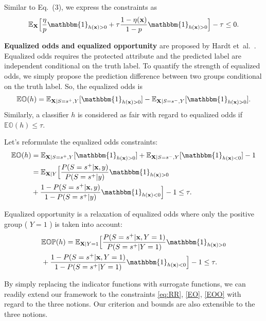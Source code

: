 \documentclass[letterpaper]{article} %
\def\etal{et~al.~}			  %
\newcommand{\X}{\mathbf{X}}
\newcommand{\x}{\mathbf{x}}
\newcommand{\Y}{Y}
\newcommand{\y}{y}
\newcommand{\E}{\mathbb{E}}
\newcommand{\I}{\mathbbm{1}}
\begin{document}
Similar to Eq.~(3), we express the constraints as
\begin{align}
	\label{eq:RR} \E_{\X} \Big[ \frac{\eta}{p} \I_{h(\x) > 0} + \tau \frac{1-\eta(\x)}{1-p} \I_{h(\x) > 0} \Big]  - \tau \leq 0.
\end{align}


\textbf{Equalized odds and equalized opportunity} are proposed by Hardt \etal \cite{Hardt2016}. Equalized odds requires the protected attribute and the predicted label are independent conditional on the truth label. To quantify the strength of equalized odds, we simply propose the prediction difference between two groups conditional on the truth label. So, the equalized odds is
\begin{align*}
	\mathbb{EO} (h) = \E_{\X|S=s^+,Y} [\I_{h(\x)>0}]  - \E_{\X|S=s^-,Y} [\I_{h(\x)>0}].
\end{align*}
Similarly, a classifier $h$ is considered as fair with regard to equalized odds if $ \mathbb{EO} (h) \leq \tau $.

Let's reformulate the equalized odds constraints:
\begin{align}
	\nonumber \mathbb{EO} (h) %
	\nonumber  & = \E_{\X|S=s^+,Y} [\I_{h(\x)>0}]  + \E_{\X|S=s^-,Y} [\I_{h(\x)<0}] - 1     \\
	\nonumber  & = \E_{\X|\Y} \Big[ \frac{P(S=s^+|\x,\y)}{P(S=s^+|\y)} \I_{h(\x)>0}         \\
	\label{EO} & +  \frac{1-P(S=s^+|\x,\y)}{1-P(S=s^+|\y)} \I_{h(\x)<0} \Big] -1 \leq \tau.
\end{align}


Equalized opportunity is a relaxation of equalized odds where only the positive group ( $Y=1$ ) is taken into account: %
\begin{align}
	\nonumber & \mathbb{EOP} (h) = \E_{\X|\Y=1} \Big[ \frac{P(S=s^+|\x,\Y=1)}{P(S=s^+|\Y=1)} \I_{h(\x)>0}      \\
	\label{EOO}                & + \frac{1-P(S=s^+|\x,\Y=1)}{1-P(S=s^+|\Y=1)} \I_{h(\x)<0} \Big] -1 \leq \tau.
\end{align}

By simply replacing the indicator functions with surrogate functions, we can readily extend our framework to the constraints \eqref{eq:RR}, \eqref{EO}, \eqref{EOO} with regard to the three notions. Our criterion and bounds are also extensible to the three notions.
\end{document}

